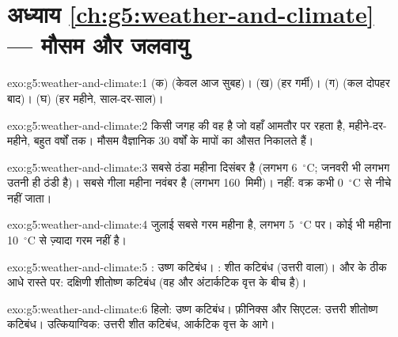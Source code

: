 \section*{अध्याय \ref{ch:g5:weather-and-climate} --- मौसम और जलवायु}

\begin{solution}{exo:g5:weather-and-climate:1}
(क)  (केवल आज सुबह)। (ख)  (हर गर्मी)। (ग) 
(कल दोपहर बाद)। (घ)  (हर महीने, साल-दर-साल)।
\end{solution}

\begin{solution}{exo:g5:weather-and-climate:2}
किसी जगह की  वह  है जो वहाँ आमतौर पर रहता है, महीने-दर-महीने, बहुत
वर्षों तक। मौसम वैज्ञानिक 30 वर्षों के मापों का औसत निकालते हैं।
\end{solution}

\begin{solution}{exo:g5:weather-and-climate:3}
सबसे ठंडा महीना दिसंबर है (लगभग 6~$^\circ$C; जनवरी भी लगभग उतनी ही ठंडी है)।
सबसे गीला महीना नवंबर है (लगभग 160~मिमी)। नहीं: वक्र कभी 0~$^\circ$C से नीचे
नहीं जाता।
\end{solution}

\begin{solution}{exo:g5:weather-and-climate:4}
जुलाई सबसे गरम महीना है, लगभग 5~$^\circ$C पर। कोई भी महीना
10~$^\circ$C से ज़्यादा गरम नहीं है।
\end{solution}

\begin{solution}{exo:g5:weather-and-climate:5}
: उष्ण कटिबंध। : शीत कटिबंध (उत्तरी वाला)। 
और  के ठीक आधे रास्ते पर: दक्षिणी शीतोष्ण कटिबंध (वह  और
अंटार्कटिक वृत्त के
बीच है)।
\end{solution}

\begin{solution}{exo:g5:weather-and-climate:6}
हिलो: उष्ण कटिबंध। फ़ीनिक्स और सिएटल: उत्तरी शीतोष्ण कटिबंध।
उत्कियाग्विक: उत्तरी शीत कटिबंध, आर्कटिक वृत्त के आगे।
\end{solution}

